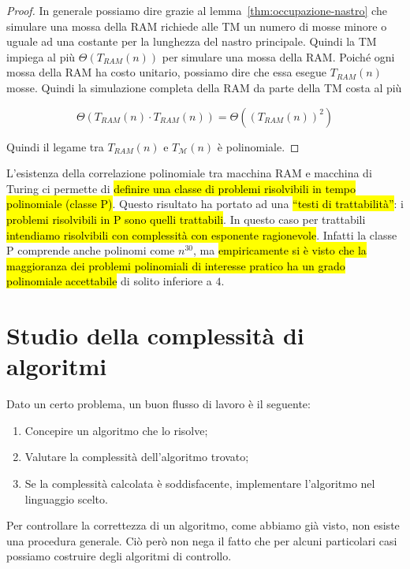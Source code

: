 \documentclass[a4paper,11pt,oneside]{article}
\theoremstyle{plain}
\theoremstyle{definition}
\theoremstyle{remark}
\begin{document}
\begin{proof}
  In generale possiamo dire grazie al lemma~\ref{thm:occupazione-nastro} che
  simulare una mossa della RAM richiede alle TM un numero di mosse minore o
  uguale ad una costante per la lunghezza del nastro principale. Quindi la TM
  impiega al più $\Theta(T_{RAM}(n))$ per simulare una mossa della RAM\@. Poiché
  ogni mossa della RAM ha costo unitario, possiamo dire che essa esegue
  $T_{RAM}(n)$ mosse. Quindi la simulazione completa della RAM da parte della TM
  costa al più

  \[
    \Theta(T_{RAM}(n) \cdot T_{RAM}(n)) = \Theta({(T_{RAM}(n))}^2)
  \]

  Quindi il legame tra $T_{RAM}(n)$ e $T_\mathcal{M}(n)$ è polinomiale.
\end{proof}

L'esistenza della correlazione polinomiale tra macchina RAM e macchina di Turing
ci permette di \hl{definire una classe di problemi risolvibili in tempo
polinomiale (classe P)}. Questo risultato ha portato ad una \hl{``testi di
trattabilità''}: i \hl{problemi risolvibili in P sono quelli trattabili}. In
questo caso per trattabili \hl{intendiamo risolvibili con complessità con
esponente ragionevole}. Infatti la classe P comprende anche polinomi come
$n^{30}$, ma \hl{empiricamente si è visto che la maggioranza dei problemi
polinomiali di interesse pratico ha un grado polinomiale accettabile} di solito
inferiore a $4$.

\section{Studio della complessità di algoritmi}\label{sec:comp-alg}

Dato un certo problema, un buon flusso di lavoro è il seguente:

\begin{enumerate}
  \item Concepire un algoritmo che lo risolve;
  \item Valutare la complessità dell'algoritmo trovato;
  \item Se la complessità calcolata è soddisfacente, implementare l'algoritmo
    nel linguaggio scelto.
\end{enumerate}

Per controllare la correttezza di un algoritmo, come abbiamo già visto, non
esiste una procedura generale. Ciò però non nega il fatto che per alcuni
particolari casi possiamo costruire degli algoritmi di controllo.
\end{document}
